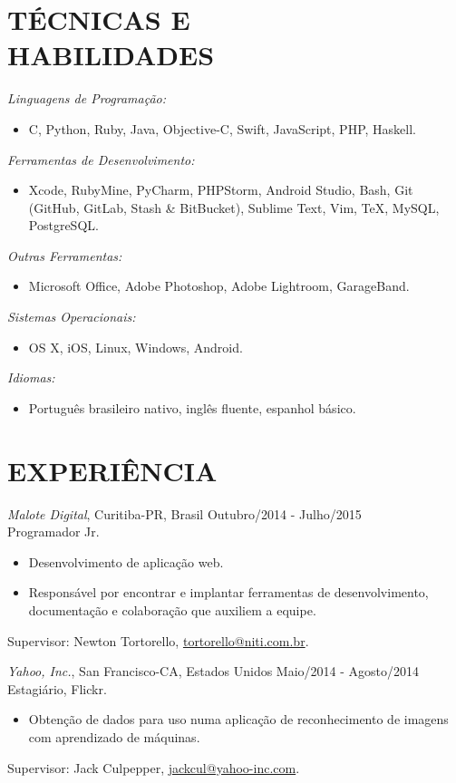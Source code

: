 \documentclass[margin]{res}
\begin{document}
\begin{resume}
		\section{TÉCNICAS E \\ HABILIDADES}
			{\sl Linguagens de Programação:}
			\begin{itemize}
	 			\item[] C, Python, Ruby, Java, Objective-C, Swift, JavaScript, PHP, Haskell.
	  		\end{itemize}
			{\sl Ferramentas de Desenvolvimento:}
			\begin{itemize}
				\item [] Xcode, RubyMine, PyCharm, PHPStorm, Android Studio, Bash, Git (GitHub, GitLab, Stash \& BitBucket), Sublime Text, Vim, \TeX, MySQL, PostgreSQL.
			\end{itemize}
			{\sl Outras Ferramentas:}
			\begin{itemize}
	 			\item[] Microsoft Office, Adobe Photoshop, Adobe Lightroom, GarageBand. 	
			\end{itemize}
		    {\sl Sistemas Operacionais:}
	 		\begin{itemize}
	 			\item[] OS X, iOS, Linux, Windows, Android.
	   		\end{itemize}
			{\sl Idiomas:}
			\begin{itemize}
				\item[] Português brasileiro nativo, inglês fluente, espanhol básico.
			\end{itemize}

 		\section{EXPERIÊNCIA}
			{\sl Malote Digital}, Curitiba-PR, Brasil \hfill Outubro/2014 - Julho/2015 \\
			Programador Jr.
			\begin{itemize}
				\itemsep -2pt
		    	\item Desenvolvimento de aplicação web.
				\item Responsável por encontrar e implantar ferramentas de desenvolvimento, documentação e colaboração que auxiliem a equipe.
			\end{itemize}
			Supervisor: Newton Tortorello, \href{mailto:tortorello@niti.com.br}{tortorello@niti.com.br}.
			
			{\sl Yahoo, Inc.}, San Francisco-CA, Estados Unidos \hfill Maio/2014 - Agosto/2014 \\
			Estagiário, Flickr.
			\begin{itemize}
				\itemsep -2pt
		    	\item Obtenção de dados para uso numa aplicação de reconhecimento de imagens com aprendizado de máquinas.
			\end{itemize}
			Supervisor: Jack Culpepper, \href{mailto:jackcul@yahoo-inc.com}{jackcul@yahoo-inc.com}.


\end{resume}
\end{document}
